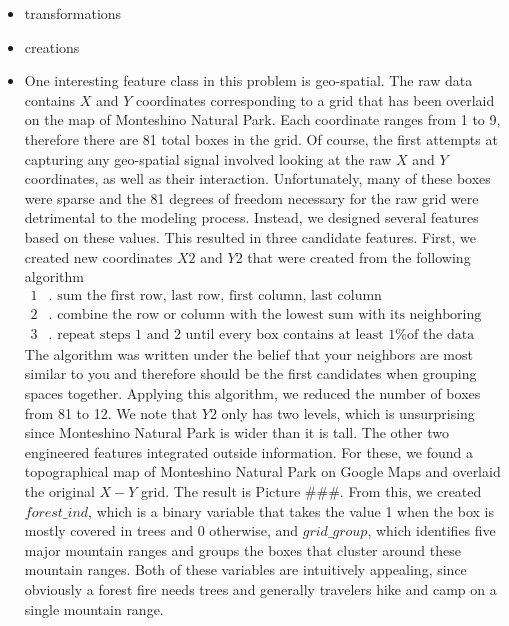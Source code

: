 \documentclass{article}
\begin{document}
\begin{itemize}

\item transformations
\item creations
\item One interesting feature class in this problem is geo-spatial. The raw data contains $X$ and $Y$ coordinates corresponding to a grid that has been overlaid on the map of Monteshino Natural Park. Each coordinate ranges from 1 to 9, therefore there are 81 total boxes in the grid. Of course, the first attempts at capturing any geo-spatial signal involved looking at the raw $X$ and $Y$ coordinates, as well as their interaction. Unfortunately, many of these boxes were sparse and the 81 degrees of freedom necessary for the raw grid were detrimental to the modeling process. Instead, we designed several features based on these values. This resulted in three candidate features. First, we created new coordinates $X2$ and $Y2$ that were created from the following algorithm
\begin{align*}
1&. \text{ sum the first row, last row, first column, last column} \\
2&. \text{ combine the row or column with the lowest sum with its neighboring row or column} \\
3&. \text{ repeat steps 1 and 2 until every box contains at least 1\% of the data}
\end{align*}
The algorithm was written under the belief that your neighbors are most similar to you and therefore should be the first candidates when grouping spaces together. Applying this algorithm, we reduced the number of boxes from 81 to 12. We note that $Y2$ only has two levels, which is unsurprising since Monteshino Natural Park is wider than it is tall. The other two engineered features integrated outside information. For these, we found a topographical map of Monteshino Natural Park on Google Maps and overlaid the original $X-Y$ grid.  The result is Picture \#\#\#. From this, we created $\textit{forest\_ind}$, which is a binary variable that takes the value 1 when the box is mostly covered in trees and 0 otherwise, and $\textit{grid\_group}$, which identifies five major mountain ranges and groups the boxes that cluster around these mountain ranges. Both of these variables are intuitively appealing, since obviously a forest fire needs trees and generally travelers hike and camp on a single mountain range.

\end{itemize}
\end{document}
